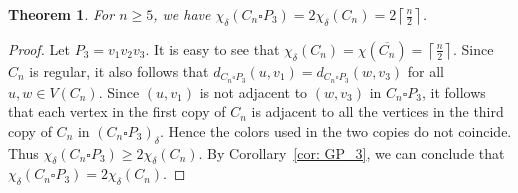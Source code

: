 \documentclass[12pt]{amsart}
\newtheorem{theorem}{Theorem}
\newtheorem{example}[theorem]{Example}
\begin{document}

\begin{theorem}\label{thm: CP}
    For $n\geq 5$, we have $\chi_{\delta}(C_n\square P_3)=2\chi_{\delta}(C_n)=2\left\lceil\frac{n}{2}\right\rceil$.
\end{theorem}
\begin{proof}
Let $P_3=v_1v_2v_3$.
It is easy to see that $\chi_{\delta}(C_n)=\chi(\overline{C_n}) = \left\lceil\frac{n}{2}\right\rceil$.
Since $C_n$ is regular, it also follows that 
$d_{C_n\square P_3}(u,v_1) = d_{C_n\square P_3}(w,v_3)$
for all $u,w\in V(C_n)$.
Since $(u,v_1)$ is not adjacent to $(w,v_3)$ in $C_n\square P_3$, it follows that each vertex in the first copy of $C_n$ is adjacent to all the vertices in the third copy of $C_n$ in $(C_n\square P_3)_\delta$.
Hence the colors used in the two copies do not coincide.
Thus $\chi_\delta(C_n\square P_3)\geq 2\chi_{\delta}(C_n)$.
By Corollary~\ref{cor: GP_3}, we can conclude that $\chi_\delta(C_n\square P_3)= 2\chi_{\delta}(C_n)$.
\end{proof}


\end{document}
